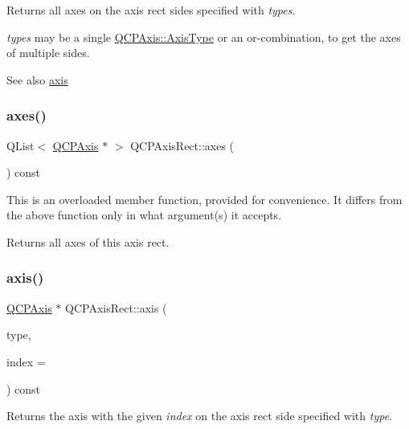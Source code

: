 Returns all axes on the axis rect sides specified with {\itshape types}.

{\itshape types} may be a single \hyperlink{classQCPAxis_ae2bcc1728b382f10f064612b368bc18a}{Q\+C\+P\+Axis\+::\+Axis\+Type} or an {\ttfamily or}-\/combination, to get the axes of multiple sides.

\begin{DoxySeeAlso}{See also}
\hyperlink{classQCPAxisRect_a583ae4f6d78b601b732183f6cabecbe1}{axis} 
\end{DoxySeeAlso}
\mbox{\label{classQCPAxisRect_a11657b8faebe9677180860e8057ede26}} 
\subsubsection{\texorpdfstring{axes()}{axes()}\hspace{0.1cm}{\footnotesize\ttfamily [2/2]}}
{\footnotesize\ttfamily Q\+List$<$ \hyperlink{classQCPAxis}{Q\+C\+P\+Axis} $\ast$ $>$ Q\+C\+P\+Axis\+Rect\+::axes (\begin{DoxyParamCaption}{ }\end{DoxyParamCaption}) const}

This is an overloaded member function, provided for convenience. It differs from the above function only in what argument(s) it accepts.

Returns all axes of this axis rect. \mbox{\label{classQCPAxisRect_a583ae4f6d78b601b732183f6cabecbe1}} 
\subsubsection{\texorpdfstring{axis()}{axis()}}
{\footnotesize\ttfamily \hyperlink{classQCPAxis}{Q\+C\+P\+Axis} $\ast$ Q\+C\+P\+Axis\+Rect\+::axis (\begin{DoxyParamCaption}\item[{\hyperlink{classQCPAxis_ae2bcc1728b382f10f064612b368bc18a}{Q\+C\+P\+Axis\+::\+Axis\+Type}}]{type,  }\item[{int}]{index = {} }\end{DoxyParamCaption}) const}

Returns the axis with the given {\itshape index} on the axis rect side specified with {\itshape type}.

